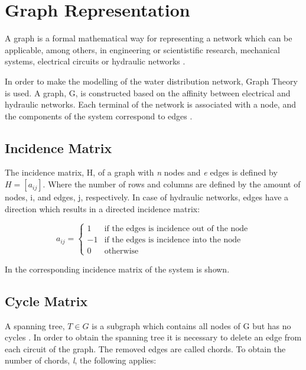 \section{Graph Representation}  
\label{GraphTheory}
A graph is a formal mathematical way for representing a network which can be applicable, among others, 
in engineering or scientistific research, mechanical systems, electrical circuits or hydraulic networks \cite{graph_intro}. 

In order to make the modelling of the water distribution network, Graph Theory is used. A graph, G, is constructed based on the affinity between electrical and hydraulic networks. 
Each terminal of the network is associated with a node, and the components of the system correspond to edges \cite{GraphTheoryCarsten}. 
\subsection{Incidence Matrix} 

The incidence matrix, H, of a graph with \textit{n} nodes and \textit{e} edges is 
defined by $H = [a_{ij}]$. Where the number of rows and columns are defined by the amount of nodes, i, and edges, j, respectively.
In case of hydraulic networks, edges have a direction which results in a directed incidence matrix:

\begin{equation}
\label{DiGraph}
 a_{ij} =
		\left\{
		\begin{array}{ll}
		
		1 			&      \text{if the edges is incidence out of the node}	
\\
		-1                       &     \text{if the edges is incidence into the node}
\\

                0                       &      \text{otherwise}

		\end{array}
		\right.
\end{equation}	

In  the corresponding incidence matrix of the system is 
shown. 

\subsection{Cycle Matrix}
\label{CycleSection}
A spanning tree, $T \in G$ is a subgraph which contains all nodes of G but has no cycles \cite{GraphModel}. 
In order to obtain the spanning tree it is necessary to delete an edge from each circuit of the graph. The removed edges are called chords. To obtain the number 
of chords, \textit{l}, the following applies:

